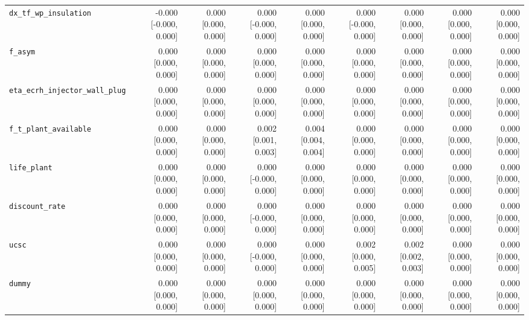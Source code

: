 \begin{tabular}{lrrrrrrrr}
\texttt{dx\_tf\_wp\_insulation} & -0.000 [-0.000, 0.000] & 0.000 [0.000, 0.000] & 0.000 [-0.000, 0.000] & 0.000 [0.000, 0.000] & 0.000 [-0.000, 0.000] & 0.000 [0.000, 0.000] & 0.000 [0.000, 0.000] & 0.000 [0.000, 0.000] \\
\texttt{f\_asym} & 0.000 [0.000, 0.000] & 0.000 [0.000, 0.000] & 0.000 [0.000, 0.000] & 0.000 [0.000, 0.000] & 0.000 [0.000, 0.000] & 0.000 [0.000, 0.000] & 0.000 [0.000, 0.000] & 0.000 [0.000, 0.000] \\
\texttt{eta\_ecrh\_injector\_wall\_plug} & 0.000 [0.000, 0.000] & 0.000 [0.000, 0.000] & 0.000 [0.000, 0.000] & 0.000 [0.000, 0.000] & 0.000 [0.000, 0.000] & 0.000 [0.000, 0.000] & 0.000 [0.000, 0.000] & 0.000 [0.000, 0.000] \\
\texttt{f\_t\_plant\_available} & 0.000 [0.000, 0.000] & 0.000 [0.000, 0.000] & 0.002 [0.001, 0.003] & 0.004 [0.004, 0.004] & 0.000 [0.000, 0.000] & 0.000 [0.000, 0.000] & 0.000 [0.000, 0.000] & 0.000 [0.000, 0.000] \\
\texttt{life\_plant} & 0.000 [0.000, 0.000] & 0.000 [0.000, 0.000] & 0.000 [-0.000, 0.000] & 0.000 [0.000, 0.000] & 0.000 [0.000, 0.000] & 0.000 [0.000, 0.000] & 0.000 [0.000, 0.000] & 0.000 [0.000, 0.000] \\
\texttt{discount\_rate} & 0.000 [0.000, 0.000] & 0.000 [0.000, 0.000] & 0.000 [-0.000, 0.000] & 0.000 [0.000, 0.000] & 0.000 [0.000, 0.000] & 0.000 [0.000, 0.000] & 0.000 [0.000, 0.000] & 0.000 [0.000, 0.000] \\
\texttt{ucsc} & 0.000 [0.000, 0.000] & 0.000 [0.000, 0.000] & 0.000 [-0.000, 0.000] & 0.000 [0.000, 0.000] & 0.002 [0.000, 0.005] & 0.002 [0.002, 0.003] & 0.000 [0.000, 0.000] & 0.000 [0.000, 0.000] \\
\texttt{dummy} & 0.000 [0.000, 0.000] & 0.000 [0.000, 0.000] & 0.000 [0.000, 0.000] & 0.000 [0.000, 0.000] & 0.000 [0.000, 0.000] & 0.000 [0.000, 0.000] & 0.000 [0.000, 0.000] & 0.000 [0.000, 0.000] \\
\bottomrule
\end{tabular}
